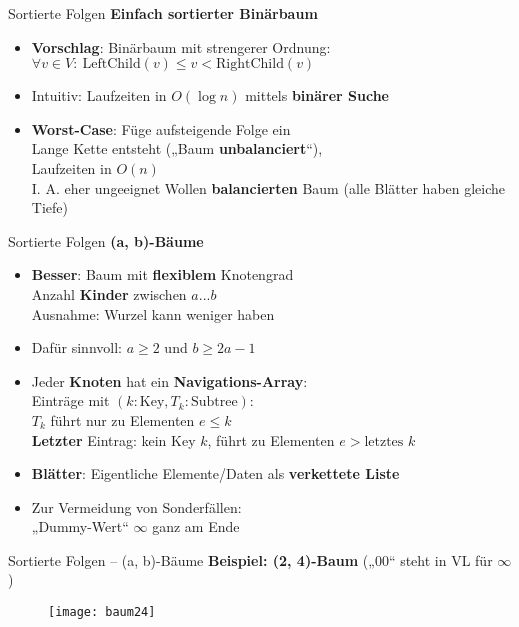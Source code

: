 \begin{frame}{Sortierte Folgen}
	\textbf{Einfach sortierter Binärbaum} 
	\begin{itemize} 
		\item \textbf{Vorschlag}: Binärbaum mit strengerer Ordnung: \\
		$\forall v \in V : \ \text{LeftChild}(v) \leq v < \text{RightChild}(v)$
		\pause
		\item Intuitiv: Laufzeiten in $O(\log n)$ mittels \textbf{binärer Suche}
		\pause
		\item[\Cons] \textbf{Worst-Case}: Füge aufsteigende Folge ein \\
		\impl Lange Kette entsteht („Baum \textbf{unbalanciert}“), \\
		Laufzeiten in $O(n)$ \frownie \\
		\pause
		\impl I. A. eher ungeeignet
		\pause
		\implitem Wollen \textbf{balancierten} Baum (alle Blätter haben gleiche Tiefe) 
	\end{itemize}
\end{frame}

\begin{frame}{Sortierte Folgen}
	\textbf{(a, b)-Bäume} 
	\begin{itemize}
		\item \textbf{Besser}: Baum mit \textbf{flexiblem} Knotengrad \\
		\impl Anzahl \textbf{Kinder} zwischen $a...b$ \\
		{\small Ausnahme: Wurzel kann weniger haben}
		\item Dafür sinnvoll: $a \geq 2$ und $b \geq 2a-1$
		\pause
		\item Jeder \textbf{Knoten} hat ein \textbf{Navigations-Array}: \\
		Einträge mit $(k: \text{Key}, T_k: \text{Subtree})$: \\
		\quad $T_k$ führt nur zu Elementen $e \leq k$ \\
		\quad \textbf{Letzter} Eintrag: kein Key $k$, führt zu Elementen $e > \text{letztes } k$
		\pause
		\item \textbf{Blätter}: Eigentliche Elemente/Daten als \textbf{verkettete Liste}
		\pause
		\item Zur Vermeidung von Sonderfällen: \\ 
		„Dummy-Wert“ $\infty$ ganz am Ende
	\end{itemize}
\end{frame}

\begin{frame}{Sortierte Folgen -- (a, b)-Bäume}
	\textbf{Beispiel: (2, 4)-Baum} („00“ steht in VL für $\infty$) \\[0,125cm]
	\begin{figure}[htp]
		\centering
		\texttt{[image: baum24]}
	\end{figure}
\end{frame}


